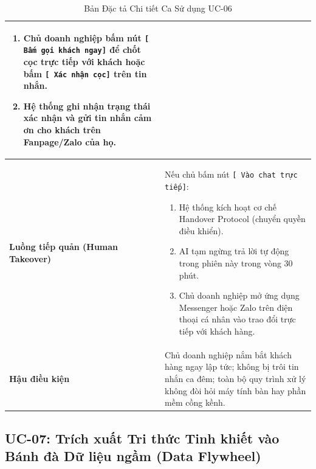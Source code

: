 \begin{table}[h!]
\begin{tabular}{|p{3.2cm}|p{11.5cm}|}
\begin{enumerate}
    \item Chủ doanh nghiệp bấm nút \texttt{[ Bấm gọi khách ngay]} để chốt cọc trực tiếp với khách hoặc bấm \texttt{[ Xác nhận cọc]} trên tin nhắn.
    \item Hệ thống ghi nhận trạng thái xác nhận và gửi tin nhắn cảm ơn cho khách trên Fanpage/Zalo của họ.
\end{enumerate} \\
\hline
\textbf{Luồng tiếp quản (Human Takeover)} & 
Nếu chủ bấm nút \texttt{[ Vào chat trực tiếp]}:
\begin{enumerate}
    \item Hệ thống kích hoạt cơ chế Handover Protocol (chuyển quyền điều khiển).
    \item AI tạm ngừng trả lời tự động trong phiên này trong vòng 30 phút.
    \item Chủ doanh nghiệp mở ứng dụng Messenger hoặc Zalo trên điện thoại cá nhân vào trao đổi trực tiếp với khách hàng.
\end{enumerate} \\
\hline
\textbf{Hậu điều kiện} & Chủ doanh nghiệp nắm bắt khách hàng ngay lập tức; không bị trôi tin nhắn ca đêm; toàn bộ quy trình xử lý không đòi hỏi máy tính bàn hay phần mềm cồng kềnh. \\
\hline
\end{tabular}
\caption{Bản Đặc tả Chi tiết Ca Sử dụng UC-06}
\label{tab:spec_uc06}
\end{table}

\subsection{UC-07: Trích xuất Tri thức Tinh khiết vào Bánh đà Dữ liệu ngầm (Data Flywheel)}
\label{subsec:spec_uc07}


